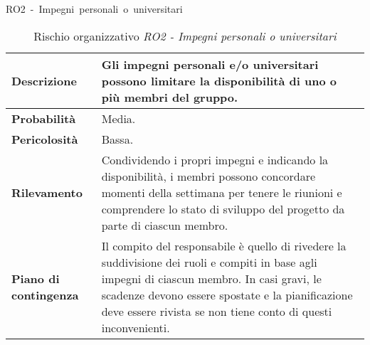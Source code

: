 \begin{table}[!h]
    \centering
    \hbox{RO2 - Impegni personali o universitari}
    \vspace{0.3cm}
	\begin{tabular}{|l|p{10cm}|} 
		\hline
		\textbf{Descrizione} & Gli impegni personali e/o universitari possono limitare la disponibilità di uno o più membri del gruppo. \\ 
        \hline
        \textbf{Probabilità} & Media. \\
        \hline
        \textbf{Pericolosità} & Bassa. \\
        \hline
        \textbf{Rilevamento} & Condividendo i propri impegni e indicando la disponibilità, i membri possono concordare momenti della settimana per tenere le riunioni e comprendere lo stato di sviluppo del progetto da parte di ciascun membro. \\
        \hline
        \textbf{Piano di contingenza} & Il compito del responsabile è quello di rivedere la suddivisione dei ruoli e compiti in base agli impegni di ciascun membro. In casi gravi, le scadenze devono essere spostate e la pianificazione deve essere rivista se non tiene conto di questi inconvenienti.\\
		\hline
	\end{tabular}
    \caption{Rischio organizzativo \textit{RO2 - Impegni personali o universitari}}
    \label{table:2}
\end{table}

